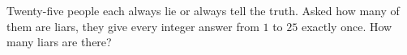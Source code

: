 Twenty-five people each always lie or always tell the truth. Asked how many of them are liars, they give every integer answer from $1$ to $25$ exactly once. How many liars are there?
